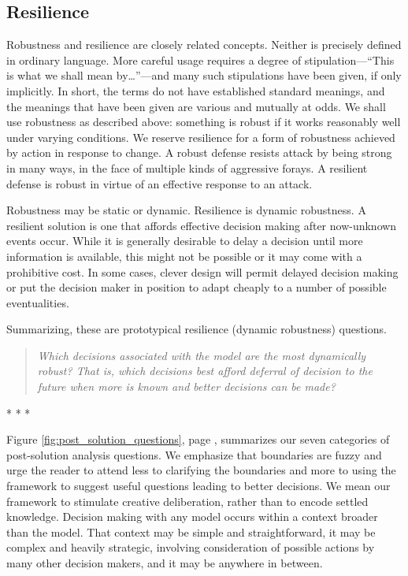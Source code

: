 \subsection{Resilience}

Robustness and resilience are closely related concepts. Neither is precisely defined in ordinary language. More careful usage requires a degree of stipulation---``This is what we shall mean by\ldots ''---and many such stipulations have been given, if only implicitly. In short, the terms do not have established standard meanings, and the meanings that have been given are various and mutually at odds. We shall use robustness as described above: something is robust if it works reasonably well under varying conditions. We reserve resilience for a form of robustness achieved by action in response to change. A robust defense resists attack by being strong in many ways, in the face of multiple kinds of aggressive forays. A resilient defense is robust in virtue of an effective response to an attack. 

Robustness may be static or dynamic. Resilience is dynamic robustness. A resilient solution is one that affords effective decision making after now-unknown events occur. While it is generally desirable to delay a decision until more information is available, this might not be possible or it may come with a prohibitive cost. In some cases, clever design will permit delayed decision making or put the decision maker in position to adapt cheaply to a number of possible eventualities.


Summarizing, these are prototypical resilience (dynamic robustness) questions.
\begin{quote}
{\it Which decisions associated with the model are the most dynamically robust? That is, which decisions best afford deferral of decision to the future when more is known and better decisions can be made?}
\end{quote}

\centerline{* * *}

Figure \ref{fig:post_solution_questions}, page \pageref{fig:post_solution_questions}, summarizes
our seven categories of post-solution analysis questions. We emphasize that boundaries are fuzzy and urge the reader to attend less to clarifying the boundaries and more to using the framework to suggest useful questions leading to better decisions. We mean our framework to stimulate creative deliberation, rather than to encode settled knowledge. Decision making with any model occurs within a context broader than the model. That context may be simple and straightforward, it may be complex and heavily strategic, involving consideration of possible actions by many other decision makers, and it may be anywhere in between.

